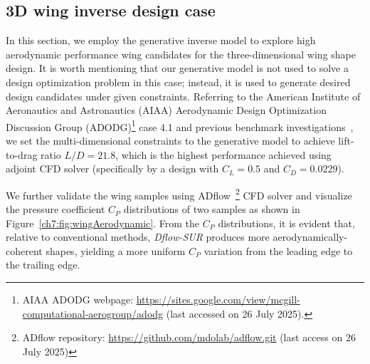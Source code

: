 \subsection{3D wing inverse design case}
\label{ch7:sect:wingCase}
In this section, we employ the generative inverse model to explore high aerodynamic performance wing candidates for the three-dimensional wing shape design. It is worth mentioning that our generative model is not used to solve a design optimization problem in this case; instead, it is used to generate desired design candidates under given constraints. 
Referring to the American Institute of Aeronautics and Astronautics (AIAA) Aerodynamic Design Optimization Discussion Group (ADODG)\footnote{AIAA ADODG webpage: \url{https://sites.google.com/view/mcgill-computational-aerogroup/adodg} (last accessed on 26 July 2025).} case 4.1 and previous benchmark investigations~\cite{aa.Lyu2015,aa.Li2021c}, we set the multi-dimensional constraints to the generative model to achieve lift-to-drag ratio $L/D = 21.8$, which is the highest performance achieved using adjoint CFD solver (specifically by a design with $C_{L} = 0.5$ and $C_{D} = 0.0229$). 

We further validate the wing samples using ADflow~\cite{aa.Mader2020,aa.Kenway2019}\footnote{ADflow repository: \url{https://github.com/mdolab/adflow.git} (last access on 26 July 2025)} CFD solver and visualize the pressure coefficient $C_{P}$ distributions of two samples as shown in Figure~\ref{ch7:fig:wingAerodynamic}. From the $C_P$ distributions, it is evident that, relative to conventional methods, \textit{Dflow-SUR} produces more aerodynamically-coherent shapes, yielding a more uniform $C_P$ variation from the leading edge to the trailing edge.

